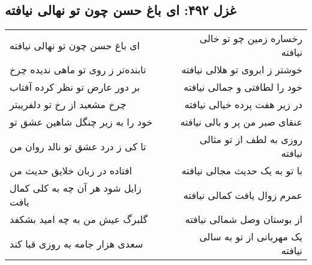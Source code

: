 \begin{center}
\section*{غزل ۴۹۲: ای باغ حسن چون تو نهالی نیافته}
\label{sec:492}
\begin{longtable}{l p{0.5cm} r}
ای باغ حسن چون تو نهالی نیافته
&&
رخساره زمین چو تو خالی نیافته
\\
تابنده‌تر ز روی تو ماهی ندیده چرخ
&&
خوشتر ز ابروی تو هلالی نیافته
\\
بر دور عارض تو نظر کرده آفتاب
&&
خود را لطافتی و جمالی نیافته
\\
چرخ مشعبد از رخ تو دلفریبتر
&&
در زیر هفت پرده خیالی نیافته
\\
خود را به زیر چنگل شاهین عشق تو
&&
عنقای صبر من پر و بالی نیافته
\\
تا کی ز درد عشق تو نالد روان من
&&
روزی به لطف از تو مثالی نیافته
\\
افتاده در زبان خلایق حدیث من
&&
با تو به یک حدیث مجالی نیافته
\\
زایل شود هر آن چه به کلی کمال یافت
&&
عمرم زوال یافت کمالی نیافته
\\
گلبرگ عیش من به چه امید بشکفد
&&
از بوستان وصل شمالی نیافته
\\
سعدی هزار جامه به روزی قبا کند
&&
یک مهربانی از تو به سالی نیافته
\\
\end{longtable}
\end{center}
